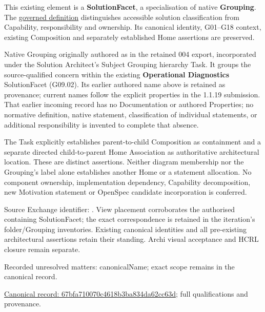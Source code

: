 This existing element is a \textbf{SolutionFacet}, a specialisation of native
\textbf{Grouping}. The \href{\detokenize{../../../../../../../governance/continuum-representation.md#solutionfacet-classification--1119-candidate}}{governed definition}
distinguishes accessible solution classification from Capability, responsibility
and ownership. Its canonical identity, G01–G18 context, existing Composition
and separately established Home assertions are preserved.



Native Grouping originally authored as \texttt{} in the retained 004 export,
incorporated under the Solution Architect's Subject Grouping hierarchy Task.
It groups the source-qualified \texttt{} concern within
the existing \textbf{Operational Diagnostics} SolutionFacet (G09.02). Its earlier authored name above is retained as provenance; current names
follow the explicit properties in the 1.1.19 submission.
That earlier incoming record has no Documentation or authored Properties; no normative
definition, native statement, classification of individual statements, or
additional responsibility is invented to complete that absence.



The Task explicitly establishes parent-to-child Composition as containment and
a separate directed child-to-parent Home Association as authoritative architectural
location. These are distinct assertions. Neither diagram membership nor the
Grouping's label alone establishes another Home or a statement allocation.
No component ownership, implementation dependency, Capability decomposition,
new Motivation statement or OpenSpec candidate incorporation is conferred.



Source Exchange identifier: \texttt{}. View placement corroborates
the authorised containing SolutionFacet; the exact correspondence is retained in the
iteration's folder/Grouping inventories. Existing canonical identities and all
pre-existing architectural assertions retain their standing. Archi visual
acceptance and HCRL closure remain separate.


{\small Recorded unresolved matters: canonicalName; exact scope remains in the canonical record.}\par
{\footnotesize \href{../../../../../../../continuum/grouping/67bfa710070c4618b3ba834da62cc63d.md}{Canonical record: 67bfa710070c4618b3ba834da62cc63d}; full qualifications and provenance.}\par
